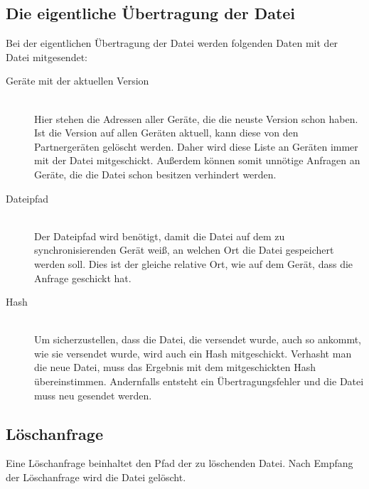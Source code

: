 \subsection{Die eigentliche Übertragung der Datei}
Bei der eigentlichen Übertragung der Datei werden folgenden Daten mit der Datei mitgesendet: 
\begin{description}
	\item[{Geräte mit der aktuellen Version}] \hfill \\
		Hier stehen die Adressen aller Geräte, die die neuste Version schon haben. Ist die Version auf allen Geräten aktuell, kann diese von den Partnergeräten gelöscht werden. Daher wird diese Liste an Geräten immer mit der Datei mitgeschickt. Außerdem können somit unnötige Anfragen an Geräte, die die Datei schon besitzen verhindert werden.
	\item[{Dateipfad}] \hfill \\
		Der Dateipfad wird benötigt, damit die Datei auf dem zu synchronisierenden Gerät weiß, an welchen Ort die Datei gespeichert werden soll. Dies ist der gleiche relative Ort, wie auf dem Gerät, dass die Anfrage geschickt hat.
	\item[{Hash}] \hfill \\
		Um sicherzustellen, dass die Datei, die versendet wurde, auch so ankommt, wie sie versendet wurde, wird auch ein Hash mitgeschickt. Verhasht man die neue Datei, muss das Ergebnis mit dem mitgeschickten Hash übereinstimmen. Andernfalls entsteht ein Übertragungsfehler und die Datei muss neu gesendet werden.
\end{description}
		
\subsection{Löschanfrage}
Eine Löschanfrage beinhaltet den Pfad der zu löschenden Datei. Nach Empfang der Löschanfrage wird die Datei gelöscht.
		

